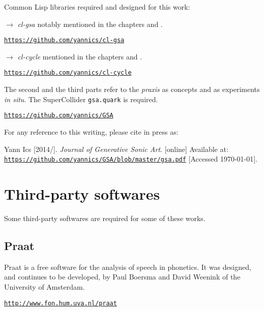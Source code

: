 \bigskip
Common Lisp libraries required and designed for this work:

\smallskip

\noindent $\rightarrow$ \textsl{cl-gsa} notably mentioned in the chapters \textsl{} and \textsl{}.

\href{https://github.com/yannics/cl-gsa}{\texttt{\small https://github.com/yannics/cl-gsa}}

\smallskip

\noindent $\rightarrow$ \textsl{cl-cycle} mentioned in the chapters \textsl{} and  \textsl{}. 

\href{https://github.com/yannics/cl-cycle}{\texttt{\small https://github.com/yannics/cl-cycle}}

\newpage
The second and the third parts refer to the \textit{praxis} as concepts and as experiments \textit{in situ}. The SuperCollider \texttt{gsa.quark} is required.

\href{https://github.com/yannics/GSA}{\texttt{\small https://github.com/yannics/GSA}}

\bigskip

For any reference to this writing, please cite in press as: 

\noindent Yann Ics [2014/\the\year]. \textit{Journal of Generative Sonic Art}. [online] Available at: \href{https://github.com/yannics/GSA/blob/master/gsa.pdf}{\texttt{\small https://github.com/yannics/GSA/blob/master/gsa.pdf}} [Accessed \today].

\section*{Third-party softwares}
\label{tps}

Some third-party softwares are required for some of these works. 

\subsection*{Praat}

Praat is a free software for the analysis of speech in phonetics. It was designed, and continues to be developed, by Paul Boersma and David Weenink of the University of Amsterdam. 

\href{http://www.fon.hum.uva.nl/praat}{\texttt{\small http://www.fon.hum.uva.nl/praat}}

\bigskip

